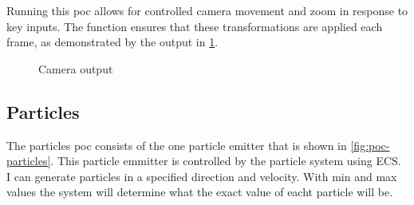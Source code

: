 \documentclass{projdoc}
\begin{document}
Running this \gls{poc} allows for controlled camera movement and zoom in response to
key inputs. The  function ensures that these
transformations are applied each frame, as demonstrated by the output in
\cref{fig:poc-output-camera}.

\begin{figure}
	\centering
	\caption{Camera  output}
	\label{fig:poc-output-camera}
\end{figure}


\subsection{Particles}
\label{poc:particle}

The particles \gls{poc} \autocite[particles example]{crepe:code-repo} consists of the
one particle emitter that is shown in \cref{fig:poc-particles}. This particle
emmitter is controlled by the particle system using ECS. I can generate particles in
a specified direction and velocity. With min and max values the system will determine
what the exact value of eacht particle will be.
\end{document}
